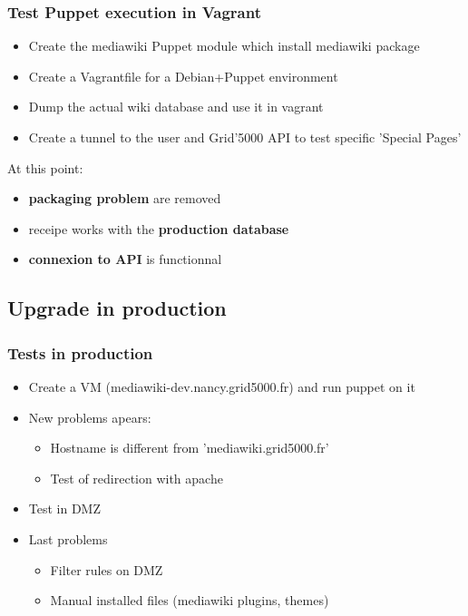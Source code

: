 \documentclass[11pt,compress]{beamer}
\begin{document}
\begin{frame}
\frametitle{Test Puppet execution in Vagrant}
\begin{itemize}
\item Create the mediawiki Puppet module which install mediawiki package
\item Create a Vagrantfile for a Debian+Puppet environment
\item Dump the actual wiki database and use it in vagrant
\item Create a tunnel to the user and Grid'5000 API to test specific 'Special Pages'
\end{itemize}
\begin{block}{}
At this point:
\begin{itemize}
\item \textbf{packaging problem} are removed
\item receipe works with the \textbf{production database}
\item \textbf{connexion to API} is functionnal
\end{itemize}
\end{block}
\end{frame}

\subsection{Upgrade in production}
\begin{frame}
\frametitle{Tests in production}
\begin{itemize}
\item Create a VM (mediawiki-dev.nancy.grid5000.fr) and run puppet on it
\item New problems apears:
\begin{itemize}
\item Hostname is different from 'mediawiki.grid5000.fr'
\item Test of redirection with apache
\end{itemize}
\item Test in DMZ
\item Last problems
\begin{itemize}
\item Filter rules on DMZ
\item Manual installed files (mediawiki plugins, themes)
\end{itemize}
\end{itemize}
\end{frame}
\end{document}
